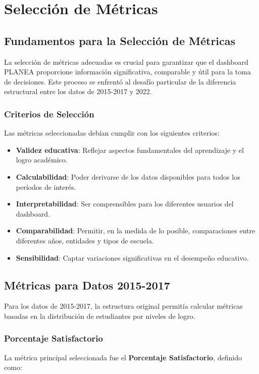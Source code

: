 \chapter{Selección de Métricas}

\section{Fundamentos para la Selección de Métricas}
La selección de métricas adecuadas es crucial para garantizar que el dashboard PLANEA proporcione información significativa, comparable y útil para la toma de decisiones. Este proceso se enfrentó al desafío particular de la diferencia estructural entre los datos de 2015-2017 y 2022.

\subsection{Criterios de Selección}
Las métricas seleccionadas debían cumplir con los siguientes criterios:

\begin{itemize}
    \item \textbf{Validez educativa}: Reflejar aspectos fundamentales del aprendizaje y el logro académico.
    \item \textbf{Calculabilidad}: Poder derivarse de los datos disponibles para todos los períodos de interés.
    \item \textbf{Interpretabilidad}: Ser comprensibles para los diferentes usuarios del dashboard.
    \item \textbf{Comparabilidad}: Permitir, en la medida de lo posible, comparaciones entre diferentes años, entidades y tipos de escuela.
    \item \textbf{Sensibilidad}: Captar variaciones significativas en el desempeño educativo.
\end{itemize}

\section{Métricas para Datos 2015-2017}
Para los datos de 2015-2017, la estructura original permitía calcular métricas basadas en la distribución de estudiantes por niveles de logro.

\subsection{Porcentaje Satisfactorio}
La métrica principal seleccionada fue el \textbf{Porcentaje Satisfactorio}, definido como:

